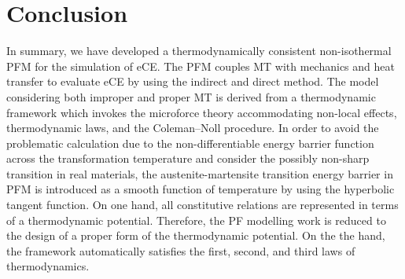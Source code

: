 \documentclass[reprint,3p,sort&compress,times,onecolumn]{elsarticle}
\begin{document}
\section{Conclusion}\label{sec5}
In summary, we have developed a thermodynamically consistent non-isothermal PFM for the simulation of eCE. The PFM couples MT with mechanics and heat transfer to evaluate eCE by using the indirect and direct method. The model considering both improper and proper MT is derived from a thermodynamic framework which invokes the microforce theory accommodating non-local effects, thermodynamic laws, and the Coleman--Noll procedure. In order to avoid the problematic calculation due to the non-differentiable energy barrier function across the transformation temperature and consider the possibly non-sharp transition in real materials, the austenite-martensite transition energy barrier in PFM is introduced as a smooth function of temperature by using the hyperbolic tangent function.
On one hand, all constitutive relations are represented in terms of a thermodynamic potential. Therefore, the PF modelling work is reduced to the design of a proper form of the thermodynamic potential. On the the hand, the framework automatically satisfies the first, second, and third laws of thermodynamics.
\end{document}

